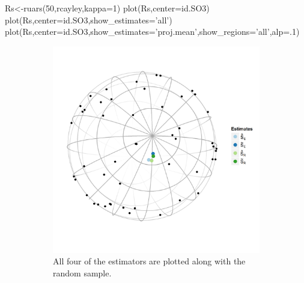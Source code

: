 \begin{example}
Rs<-ruars(50,rcayley,kappa=1)
plot(Rs,center=id.SO3)
plot(Rs,center=id.SO3,show_estimates='all')
plot(Rs,center=id.SO3,show_estimates='proj.mean',show_regions='all',alp=.1)
\end{example}




\begin{figure}[h]
	\centering
	\begin{subfigure}[h]{.45\textwidth}
		\includegraphics[width=\textwidth]{figures/eye2}
		\caption{All four of the estimators are plotted along with the random sample.}
		\label{fig:ests}
	\end{subfigure}
	\begin{subfigure}[h]{.45\textwidth}

\end{subfigure}
\end{figure}
